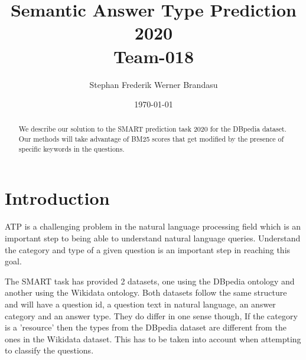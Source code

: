 \documentclass[sigconf]{acmart}
\begin{document}

\title{%
  Semantic Answer Type Prediction 2020 \\
  \large Team-018}

\author{Stephan Frederik Werner Brandasu}

\date{\today}



\begin{abstract}
We describe our solution to the \gls{SMART} prediction task 2020 for the DBpedia dataset. Our methods will take advantage of BM25 scores that get modified by the presence of specific keywords in the questions.
\end{abstract}


\renewcommand\footnotetextcopyrightpermission[1]{}
\pagestyle{plain}

\maketitle

\section{Introduction}
\gls{ATP} is a challenging problem in the natural language processing field which is an important step to being able to understand natural language queries. Understand the category and type of a given question is an important step in reaching this goal.

The \gls{SMART} task has provided 2 datasets, one using the DBpedia ontology and another using the Wikidata ontology.
Both datasets follow the same structure and will have a question id, a question text in natural language, an answer category and an answer type. They do differ in one sense though, If the category is a 'resource' then the types from the DBpedia dataset are different from the ones in the Wikidata dataset. This has to be taken into account when attempting to classify the questions.
\end{document}
